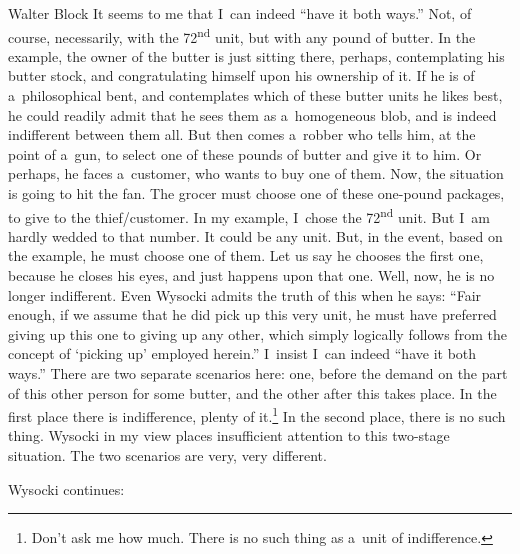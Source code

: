 \begin{artengenv}{Walter Block}
It seems to me that I~can indeed ``have it both ways.'' Not, of course, necessarily, with the 72\textsuperscript{nd} unit, but with any pound of butter. In the example, the owner of the butter is just sitting there, perhaps, contemplating his butter stock, and congratulating himself upon his ownership of it. If he is of a~philosophical bent, and contemplates which of these butter units he likes best, he could readily admit that he sees them as a~homogeneous blob, and is indeed indifferent between them all. But then comes a~robber who tells him, at the point of a~gun, to select one of these pounds of butter and give it to him. Or perhaps, he faces a~customer, who wants to buy one of them. Now, the situation is going to hit the fan. The grocer must choose one of these one-pound packages, to give to the thief/customer. In my example, I~chose the 72\textsuperscript{nd} unit. But I~am hardly wedded to that number. It could be any unit. But, in the event, based on the example, he must choose one of them. Let us say he chooses the first one, because he closes his eyes, and just happens upon that one. Well, now, he is no longer indifferent. Even Wysocki admits the truth of this when he says: ``Fair enough, if we assume that he did pick up this very unit, he must have preferred giving up this one to giving up any other, which simply logically follows from the concept of ‘picking up' employed herein.'' I~insist I~can indeed ``have it both ways.'' There are two separate scenarios here: one, before the demand on the part of this other person for some butter, and the other after this takes place. In the first place there is indifference, plenty of it.\footnote{Don't ask me how much. There is no such thing as a~unit of indifference.} In the second place, there is no such thing. Wysocki in my view places insufficient attention to this two-stage situation. The two scenarios are very, very different.

Wysocki continues:



\end{artengenv}
